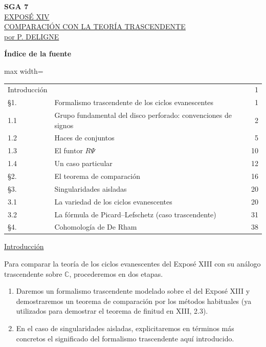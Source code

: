 
\clearpage
\pageoriginale

\begin{center}
{\large\textbf{SGA 7}}\\[1.5em]
{\Large\underline{EXPOSÉ XIV}}\\[2.5em]
{\Large\underline{\underline{COMPARACIÓN CON LA TEORÍA TRASCENDENTE}}}\\[1.5em]
{\large\underline{por P. DELIGNE}}
\end{center}

\bigskip
\noindent\textbf{Índice de la fuente}
\begin{center}
\begin{adjustbox}{max width=\linewidth}\begin{tabular}{@{}llr@{}}
Introducción && 1\\
\S1. & Formalismo trascendente de los ciclos evanescentes & 1\\
1.1 & Grupo fundamental del disco perforado: convenciones de signos & 2\\
1.2 & Haces de conjuntos & 5\\
1.3 & El funtor $R\Psi$ & 10\\
1.4 & Un caso particular & 12\\
\S2. & El teorema de comparación & 16\\
\S3. & Singularidades aisladas & 20\\
3.1 & La variedad de los ciclos evanescentes & 20\\
3.2 & La fórmula de Picard--Lefschetz (caso trascendente) & 31\\
\S4. & Cohomología de De Rham & 38
\end{tabular}\end{adjustbox}
\end{center}

\medskip
\noindent\underline{Introducción}

Para comparar la teoría de los ciclos evanescentes del Exposé XIII con su
análogo trascendente sobre $\mathbb C$, procederemos en dos etapas.

\begin{enumerate}[label=(\alph*),leftmargin=2.6em]
\item Daremos un formalismo trascendente modelado sobre el del Exposé XIII y
demostraremos un teorema de comparación por los métodos habituales (ya
utilizados para demostrar el teorema de finitud en XIII, 2.3).

\item En el caso de singularidades aisladas, explicitaremos en términos más
concretos el significado del formalismo trascendente aquí introducido.
\end{enumerate}

